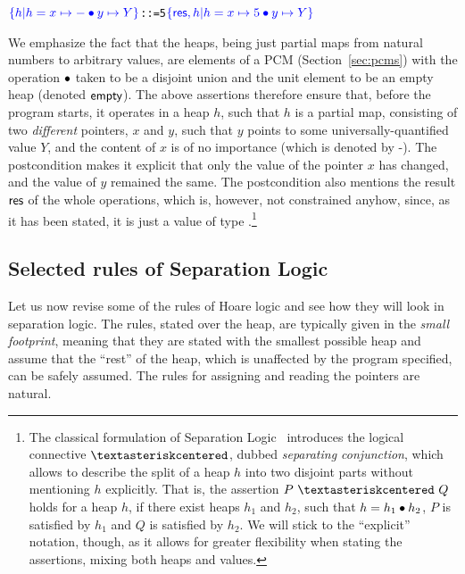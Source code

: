 \label{pg:alterx}
\begin{alltt}
\(\spec{h | h = x \mapsto - \join y \mapsto Y}\)  ::= 5 \(\spec{\res, h | h = x \mapsto 5 \join y \mapsto Y}\)
\end{alltt}

We emphasize the fact that the heaps, being just partial maps from
natural numbers to arbitrary values, are elements of a PCM
(Section~\ref{sec:pcms}) with the operation $\bullet$ taken to be a
disjoint union and the unit element to be an empty heap (denoted
$\mathsf{empty}$).  The above assertions therefore ensure that,
before the program starts, it operates in a heap $h$, such that $h$ is
a partial map, consisting of two \textit{different} pointers, $x$ and $y$,
such that $y$ points to some universally-quantified value $Y$, and the
content of $x$ is of no importance (which is denoted by -). The
postcondition makes it explicit that only the value of the pointer $x$
has changed, and the value of $y$ remained the same. The
postcondition also mentions the result $\mathsf{res}$ of the whole operations,
which is, however, not constrained anyhow, since, as it has been
stated, it is just a value of type .\footnote{The classical
formulation of Separation Logic~\cite{Reynolds:LICS02} introduces the
logical connective $\sep$, dubbed \emph{separating conjunction},
 which allows to describe the split of a
heap $h$ into two disjoint parts without mentioning $h$
explicitly. That is, the assertion $P~\sep~Q$ holds for a heap $h$, if
there exist heaps $h_1$ and $h_2$, such that $h = h_1 \bullet h_2$, $P$
is satisfied by $h_1$ and $Q$ is satisfied by $h_2$. We will stick to
the ``explicit'' notation, though, as it allows for greater
flexibility when stating the assertions, mixing both heaps and
values.}
\subsection{Selected rules of Separation Logic}


\label{sec:seplog-rules}
Let us now revise some of the rules of Hoare logic and see how they
will look in separation logic. The rules, stated over the heap, are
typically given in the \textit{small footprint}, 
meaning that they are stated with the smallest possible heap and assume
that the ``rest'' of the heap, which is unaffected by the program
specified, can be safely assumed. The rules for assigning and reading
the pointers are natural.


